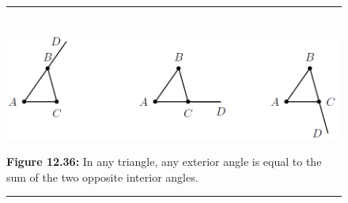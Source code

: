 	\begin{figure}[H] %
    \begin{center}
    \rule[.1in]{\figurerulewidth}{.005in} \\
        \label{m39368*uid46!!!underscore!!!media}\label{m39368*uid46!!!underscore!!!printimage}\includegraphics[width=.8\columnwidth]{col11306.imgs/m39368_MG10C13_030.png} %
      \vspace{2pt}
    \vspace{\rubberspace}\par \begin{cnxcaption}
	  \small \textbf{Figure 12.36: }In any triangle, any exterior angle is equal to the sum of the two opposite interior angles.
	\end{cnxcaption}
    \vspace{.1in}
    \rule[.1in]{\figurerulewidth}{.005in} \\
    \end{center}
 \end{figure}       
        \label{m39368*uid47}
